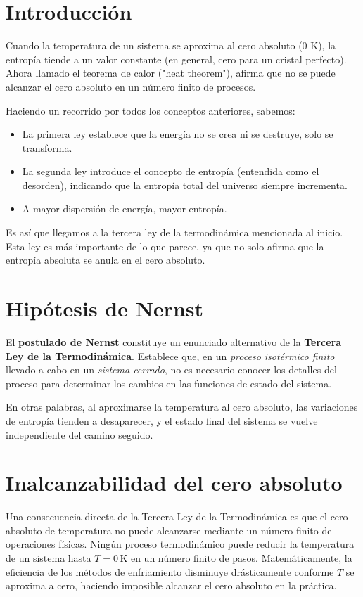 
\section{Introducción}
Cuando la temperatura de un sistema se aproxima al cero absoluto (0 K), la entropía tiende a un valor constante (en general, cero para un cristal perfecto).  
Ahora llamado el teorema de calor ("heat theorem"), afirma que no se puede alcanzar el cero absoluto en un número finito de procesos.

Haciendo un recorrido por todos los conceptos anteriores, sabemos:
\begin{itemize}
    \item La primera ley establece que la energía no se crea ni se destruye, solo se transforma.
    \item La segunda ley introduce el concepto de entropía (entendida como el desorden), indicando que la entropía total del universo siempre incrementa.
    \item A mayor dispersión de energía, mayor entropía.
\end{itemize}

Es así que llegamos a la tercera ley de la termodinámica mencionada al inicio.  
Esta ley es más importante de lo que parece, ya que no solo afirma que la entropía absoluta se anula en el cero absoluto.

\section{Hipótesis de Nernst}
El \textbf{postulado de Nernst} constituye un enunciado alternativo de la \textbf{Tercera Ley de la Termodinámica}.  
Establece que, en un \textit{proceso isotérmico finito} llevado a cabo en un \textit{sistema cerrado}, 
no es necesario conocer los detalles del proceso para determinar los cambios en las funciones de estado del sistema.  

En otras palabras, al aproximarse la temperatura al cero absoluto, las variaciones de entropía tienden a desaparecer, 
y el estado final del sistema se vuelve independiente del camino seguido.

\section{Inalcanzabilidad del cero absoluto}
Una consecuencia directa de la Tercera Ley de la Termodinámica es que el cero absoluto de temperatura no puede alcanzarse mediante un número finito de operaciones físicas.  
Ningún proceso termodinámico puede reducir la temperatura de un sistema hasta $T = 0\,\mathrm{K}$ en un número finito de pasos.  
Matemáticamente, la eficiencia de los métodos de enfriamiento disminuye drásticamente conforme $T$ se aproxima a cero, haciendo imposible alcanzar el cero absoluto en la práctica.

